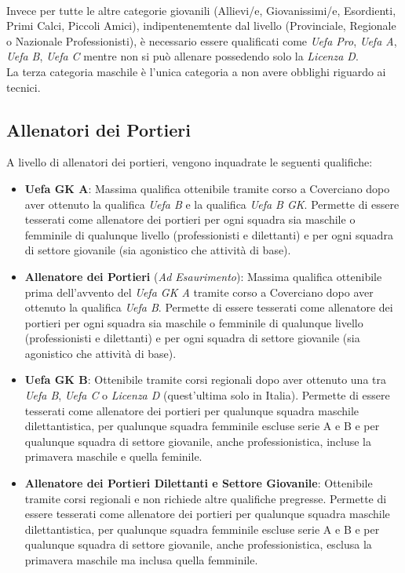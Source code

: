\documentclass[../uefaC.tex]{subfiles}
\begin{document}
\hfill \\
Invece per tutte le altre categorie giovanili (Allievi/e, Giovanissimi/e, Esordienti, Primi Calci, Piccoli Amici), indipentenemtente dal livello (Provinciale, Regionale o Nazionale Professionisti), è necessario essere qualificati come \emph{Uefa Pro}, \emph{Uefa A}, \emph{Uefa B}, \emph{Uefa C} mentre non si può allenare possedendo solo la \emph{Licenza D}. \hfill \\
La terza categoria maschile è l'unica categoria a non avere obblighi riguardo ai tecnici.

\subsection{Allenatori dei Portieri}
A livello di allenatori dei portieri, vengono inquadrate le seguenti qualifiche:

\begin{itemize}
    \item\textbf{Uefa GK A}: Massima qualifica ottenibile tramite corso a Coverciano dopo aver ottenuto la qualifica \emph{Uefa B} e la qualifica \emph{Uefa B GK}. Permette di essere tesserati come allenatore dei portieri per ogni squadra sia maschile o femminile di qualunque livello (professionisti e dilettanti) e per ogni squadra di settore giovanile (sia agonistico che attività di base).
    \item\textbf{Allenatore dei Portieri} (\emph{Ad Esaurimento}): Massima qualifica ottenibile prima dell'avvento del \emph{Uefa GK A} tramite corso a Coverciano dopo aver ottenuto la qualifica \emph{Uefa B}. Permette di essere tesserati come allenatore dei portieri per ogni squadra sia maschile o femminile di qualunque livello (professionisti e dilettanti) e per ogni squadra di settore giovanile (sia agonistico che attività di base).
    \item\textbf{Uefa GK B}: Ottenibile tramite corsi regionali dopo aver ottenuto una tra \emph{Uefa B}, \emph{Uefa C} o \emph{Licenza D} (quest'ultima solo in Italia). Permette di essere tesserati come allenatore dei portieri per qualunque squadra maschile dilettantistica, per qualunque squadra femminile escluse serie A e B e per qualunque squadra di settore giovanile, anche professionistica, incluse la primavera maschile e quella feminile.
    \item\textbf{Allenatore dei Portieri Dilettanti e Settore Giovanile}: Ottenibile tramite corsi regionali e non richiede altre qualifiche pregresse. Permette di essere tesserati come allenatore dei portieri per qualunque squadra maschile dilettantistica, per qualunque squadra femminile escluse serie A e B e per qualunque squadra di settore giovanile, anche professionistica, esclusa la primavera maschile ma inclusa quella femminile.
\end{itemize}
\end{document}
